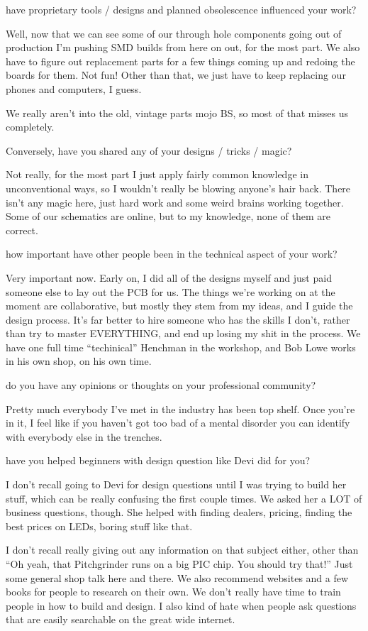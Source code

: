 have proprietary tools / designs and planned obsolescence influenced
your work? 

Well, now that we can see some of our through hole components going out 
of production I'm pushing SMD builds from here on out, for the most part. We 
also have to figure out replacement parts for a few things coming up and redoing 
the boards for them. Not fun! Other than that, we just have to keep replacing our 
phones and computers, I guess.  

We really aren’t into the old, vintage parts mojo BS, so most of that misses 
us completely.

Conversely, have you shared any of your designs / tricks / magic? 

Not really, for the most part I just apply fairly common knowledge in
unconventional ways, so I wouldn't really be blowing anyone's hair back. There 
isn’t any magic here, just hard work and some weird brains working together.  
Some of our schematics are online, but to my knowledge, none of them 
are correct. 

how important have other people been in the technical aspect of your
work? 

Very important now. Early on, I did all of the designs myself and just paid 
someone else to lay out the PCB for us. The things we're working on at the 
moment are collaborative, but mostly they stem from my ideas, and I guide the 
design process. It's far better to hire someone who has the skills I don't, rather 
than try to master EVERYTHING, and end up losing my shit in the process. We 
have one full time “techinical” Henchman in the workshop, and Bob Lowe works 
in his own shop, on his own time. 

do you have any opinions or thoughts on your professional community? 

Pretty much everybody I've met in the industry has been top shelf. Once 
you're in it, I feel like if you haven't got too bad of a mental disorder you can 
identify with everybody else in the trenches. 

have you helped beginners with design question like Devi did for you? 

I don't recall going to Devi for design questions until I was trying to build 
her stuff, which can be really confusing the first couple times. We asked her a 
LOT of business questions, though.  She helped with finding dealers, pricing, 
finding the best prices on LEDs, boring stuff like that. 

I don't recall really giving out any information on that subject either, other 
than “Oh yeah, that Pitchgrinder runs on a big PIC chip. You should try that!” Just 
some general shop talk here and there. We also recommend websites and a few 
books for people to research on their own. We don’t really have time to train 
people in how to build and design. I also kind of hate when people ask questions 
that are easily searchable on the great wide internet.

